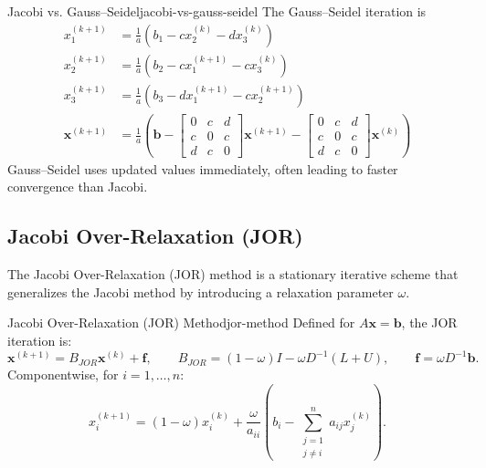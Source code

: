 \begin{example}{Jacobi vs. Gauss--Seidel}{jacobi-vs-gauss-seidel}
    The Gauss--Seidel iteration is
    \begin{align*}
        x_1^{(k+1)}        & = \frac{1}{a}(b_1 - c x_2^{(k)} - d x_3^{(k)})              \\
        x_2^{(k+1)}        & = \frac{1}{a}(b_2 - c x_1^{(k+1)} - c x_3^{(k)})            \\
        x_3^{(k+1)}        & = \frac{1}{a}(b_3 - d x_1^{(k+1)} - c x_2^{(k+1)})          \\
        \mathbf{x}^{(k+1)} & = \frac{1}{a}(\mathbf{b} - \begin{bmatrix}
                                                            0 & c & d \\
                                                            c & 0 & c \\
                                                            d & c & 0
                                                        \end{bmatrix} \mathbf{x}^{(k+1)}
        -
        \begin{bmatrix}
            0 & c & d \\
            c & 0 & c \\
            d & c & 0
        \end{bmatrix} \mathbf{x}^{(k)})
    \end{align*}
    Gauss--Seidel uses updated values immediately, often leading to faster convergence than Jacobi.
\end{example}

\subsection{Jacobi Over-Relaxation (JOR)}
The Jacobi Over-Relaxation (JOR) method is a stationary iterative scheme that generalizes the Jacobi method by introducing a relaxation parameter \(\omega\).


\begin{definition}{Jacobi Over-Relaxation (JOR) Method}{jor-method}
    Defined for \(A\mathbf{x} = \mathbf{b}\), the JOR iteration is:
    \[
        \mathbf{x}^{(k+1)} = B_{JOR} \mathbf{x}^{(k)} + \mathbf{f}, \qquad
        B_{JOR} = (1-\omega)I - \omega D^{-1}(L + U), \qquad
        \mathbf{f} = \omega D^{-1}\mathbf{b}.
    \]
    Componentwise, for \(i = 1, \ldots, n\):
    \begin{equation*}
        x_i^{(k+1)} = (1-\omega)x_i^{(k)} + \frac{\omega}{a_{ii}}\left(b_i - \sum_{\substack{j=1 \\ j \neq i}}^n a_{ij} x_j^{(k)}\right).
    \end{equation*}
\end{definition}

